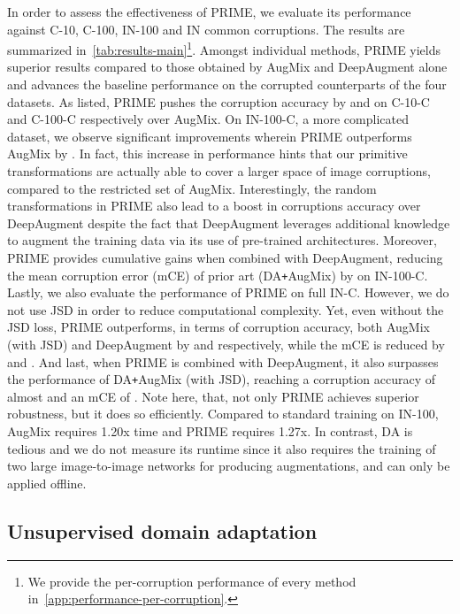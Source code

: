 \documentclass[runningheads]{llncs}
\begin{document}
In order to assess the effectiveness of PRIME, we evaluate its performance against C-10, C-100, IN-100 and IN common corruptions. The results are summarized in~\cref{tab:results-main}\footnote{We provide the per-corruption performance of every method in~\cref{app:performance-per-corruption}.}. Amongst individual methods, PRIME yields superior results compared to those obtained by AugMix and DeepAugment alone and advances the baseline performance on the corrupted counterparts of the four datasets. As listed, PRIME pushes the corruption accuracy by  and  on C-10-C and C-100-C respectively over AugMix. On IN-100-C, a more complicated dataset, we observe significant improvements wherein PRIME outperforms AugMix by . In fact, this increase in performance hints that our primitive transformations are actually able to cover a larger space of image corruptions, compared to the restricted set of AugMix. Interestingly, the random transformations in PRIME also lead to a  boost in corruptions accuracy over DeepAugment despite the fact that DeepAugment leverages additional knowledge to augment the training data via its use of pre-trained architectures. Moreover, PRIME provides cumulative gains when combined with DeepAugment, reducing the mean corruption error (mCE) of prior art (DA\texttt{+}AugMix) by  on IN-100-C. Lastly, we also evaluate the performance of PRIME on full IN-C. However, we do not use JSD in order to reduce computational complexity. Yet, even without the JSD loss, PRIME outperforms, in terms of corruption accuracy, both AugMix (with JSD) and DeepAugment by  and  respectively, while the mCE is reduced by  and . And last, when PRIME is combined with DeepAugment, it also surpasses the performance of DA\texttt{+}AugMix (with JSD), reaching a corruption accuracy of almost  and an mCE of . Note here, that, not only PRIME achieves superior robustness, but it does so efficiently. Compared to standard training on IN-100, AugMix requires 1.20x time and PRIME requires 1.27x. In contrast, DA is tedious and we do not measure its runtime since it also requires the training of two large image-to-image networks for producing augmentations, and can only be applied offline.








\subsection{Unsupervised domain adaptation}
\label{subsec:unsupervised-adaptation}
\end{document}
